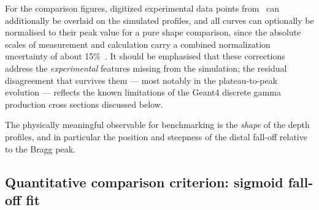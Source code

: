 \documentclass[a4paper]{article}
\begin{document}
For the comparison figures, digitized experimental data points from~\cite{kelleter2017} can additionally be overlaid on the simulated profiles, and all curves can optionally be normalised to their peak value for a pure shape comparison, since the absolute scales of measurement and calculation carry a combined normalization uncertainty of about 15\%~\cite{kelleter2017}. It should be emphasised that these corrections address the \emph{experimental} features missing from the simulation; the residual disagreement that survives them — most notably in the plateau-to-peak evolution — reflects the known limitations of the Geant4 discrete gamma production cross sections discussed below.

The physically meaningful observable for benchmarking is the \emph{shape} of the depth profiles, and in particular the position and steepness of the distal fall-off relative to the Bragg peak.

\subsection{Quantitative comparison criterion: sigmoid fall-off fit}
\label{sec:metrics}
\end{document}
